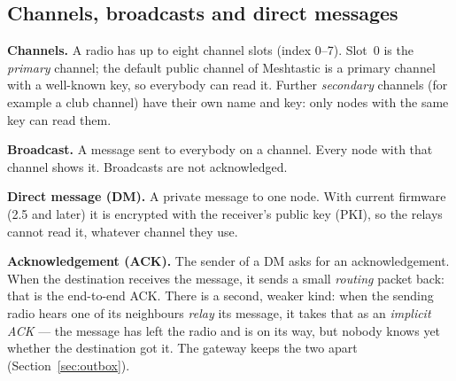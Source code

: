 \documentclass[10pt,a4paper]{article}
\newcommand{\lead}[1]{\textbf{#1}\enspace}           %
\begin{document}
\subsection{Channels, broadcasts and direct messages}
\lead{Channels.} A radio has up to eight channel slots (index 0--7). Slot~0 is the \emph{primary} channel; the default public channel of Meshtastic is a primary channel with a well-known key, so everybody can read it. Further \emph{secondary} channels (for example a club channel) have their own name and key: only nodes with the same key can read them.

\lead{Broadcast.} A message sent to everybody on a channel. Every node with that channel shows it. Broadcasts are not acknowledged.

\lead{Direct message (DM).} A private message to one node. With current firmware (2.5 and later) it is encrypted with the receiver's public key (PKI), so the relays cannot read it, whatever channel they use.

\lead{Acknowledgement (ACK).} The sender of a DM asks for an acknowledgement. When the destination receives the message, it sends a small \emph{routing} packet back: that is the end-to-end ACK. There is a second, weaker kind: when the sending radio hears one of its neighbours \emph{relay} its message, it takes that as an \emph{implicit ACK} --- the message has left the radio and is on its way, but nobody knows yet whether the destination got it. The gateway keeps the two apart (Section~\ref{sec:outbox}).
\end{document}

